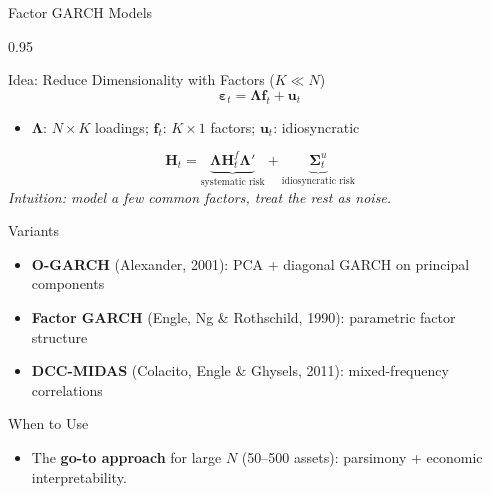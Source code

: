 \documentclass[9pt, aspectratio=169, t]{beamer}
\begin{document}
\begin{frame}{Factor GARCH Models}
    \begin{cminipage}{0.95\textwidth}
    \vspace{-2mm}
    {\scriptsize
    \begin{block}{Idea: Reduce Dimensionality with Factors ($K \ll N$)}
        \vspace{-2mm}
        \[
            \boldsymbol{\varepsilon}_t = \mathbf{\Lambda}\mathbf{f}_t + \mathbf{u}_t
        \]
        \vspace{-3mm}
        \begin{itemize}\setlength{\itemsep}{0pt}
            \item $\mathbf{\Lambda}$: $N \times K$ loadings; $\mathbf{f}_t$: $K \times 1$ factors; $\mathbf{u}_t$: idiosyncratic
        \end{itemize}
        \vspace{-2mm}
        \[
            \mathbf{H}_t = \underbrace{\mathbf{\Lambda}\mathbf{H}_t^f\mathbf{\Lambda}'}_{\text{systematic risk}} + \underbrace{\boldsymbol{\Sigma}_t^u}_{\text{idiosyncratic risk}}
        \]
        \vspace{-2mm}
        \textit{Intuition: model a few common factors, treat the rest as noise.}
    \end{block}
    \begin{block}{Variants}
        \begin{itemize}\setlength{\itemsep}{0pt}
            \item \textbf{O-GARCH} (Alexander, 2001): PCA + diagonal GARCH on principal components
            \item \textbf{Factor GARCH} (Engle, Ng \& Rothschild, 1990): parametric factor structure
            \item \textbf{DCC-MIDAS} (Colacito, Engle \& Ghysels, 2011): mixed-frequency correlations
        \end{itemize}
    \end{block}
    \begin{alertblock}{When to Use}
        \begin{itemize}\setlength{\itemsep}{0pt}
            \item The \textbf{go-to approach} for large $N$ (50--500 assets): parsimony + economic interpretability.
        \end{itemize}
    \end{alertblock}
    }
    \end{cminipage}
\end{frame}
\end{document}
